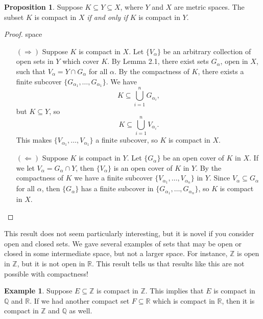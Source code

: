 \documentclass{article}
\newcommand{\R}{\mathbb{R}}
\newcommand{\Q}{\mathbb{Q}}
\newcommand{\Z}{\mathbb{Z}}
\theoremstyle{definition}
\newtheorem{proposition}{Proposition}[section]
\newtheorem{example}{Example}[section]
\begin{document}
	\begin{proposition}
		Suppose $ K\subseteq Y\subseteq X $, where $ Y $ and $ X $ are metric spaces. The subset $ K $ is compact in $ X $ \textit{if and only if} $ K $ is compact in $ Y $.  
	\end{proposition}
	\begin{proof}{\color{white}space}
		\begin{enumerate}
			\item[$ (\Longrightarrow) $] Suppose $ K $ is compact in $ X $. Let $ \{V_\alpha\} $ be an arbitrary collection of open sets in $ Y $ which cover $ K $. By Lemma 2.1, there exist sets $ G_\alpha $, open in $ X $, such that $ V_\alpha=Y\cap G_\alpha $ for all $ \alpha $. By the compactness of $ K $, there exists a finite subcover $ \{G_{\alpha_1},\ldots,G_{\alpha_1}\} $. We have $$ K\subseteq\bigcup_{i=1}^n G_{\alpha_i} ,$$ but $ K\subseteq Y $, so $$ K\subseteq\bigcup_{i=1}^n V_{\alpha_i} . $$ This makes $ \{V_{\alpha_1},\ldots,V_{\alpha_1}\} $ a finite subcover, so $ K $ is compact in $ X $. 
			\item[$ (\Longleftarrow) $] Suppose $ K $ is compact in $ Y $. Let $ \{G_\alpha\} $ be an open cover of $ K $ in $ X $. If we let $ V_\alpha=G_\alpha\cap Y $, then $ \{V_\alpha\} $ is an open cover of $ K $ in $ Y $. By the compactness of $ K $ we have a finite subcover $ \{V_{\alpha_1},\ldots,V_{\alpha_n}\} $ in $ Y $. Since $ V_\alpha\subseteq G_\alpha $ for all $ \alpha $, then $ \{G_\alpha\} $ has a finite subcover in $ \{G_{\alpha_1},\ldots,G_{\alpha_n}\} $, so $ K $ is compact in $ X $. 
		\end{enumerate}
		
	\end{proof}
	This result does not seem particularly interesting, but it is novel if you consider open and closed sets. We gave several examples of sets that may be open or closed in some intermediate space, but not a larger space. For instance, $ \Z $ is open in $ \Z $, but it is not open in $ \R $. This result tells us that results like this are not possible with compactness!
	\begin{example}
		Suppose $ E\subseteq \Z $ is compact in $ \Z $. This implies that $ E $ is compact in $ \Q $ and $ \R $. If we had another compact set $ F\subseteq\R $ which is compact in $ \R $, then it is compact in $ \Z $ and $ \Q $ as well. 
	\end{example}
	
\end{document}
